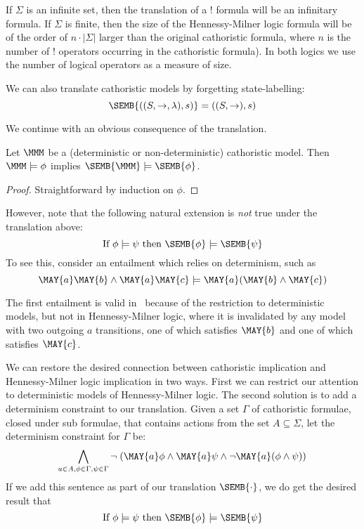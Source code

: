\NI If $\Sigma$ is an infinite set, then the translation of a $!$
formula will be an infinitary formula.  If $\Sigma$ is finite, then
the size of the Hennessy-Milner logic formula will be of the order of $n \cdot | \Sigma |$
larger than the original cathoristic formula, where $n$ is the number of
$!$ operators occurring in the cathoristic formula). In both logics we
use the number of logical operators as a measure of size.

We can also translate cathoristic models by forgetting state-labelling:
\[
   \SEMB{((S, \rightarrow, \lambda), s)} 
      =
   ((S, \rightarrow), s)
\]

\NI We continue with an obvious consequence of the translation.

\begin{theorem}
Let $\MMM$ be a (deterministic or non-deterministic) cathoristic
  model. Then $\MMM \models \phi$ implies $\SEMB{\MMM} \models
  \SEMB{\phi}$.
\end{theorem}
\begin{proof}
Straightforward by induction on $\phi$.
\end{proof}

\NI However, note that the following natural extension is \emph{not} true
under the translation above:
\[
  \text{If } \phi \models \psi \text{ then } \SEMB{\phi} \models \SEMB{\psi}
\]
To see this, consider an entailment which relies on determinism, such as
\[
\MAY{a} \MAY{b} \land \MAY{a} \MAY{c} \models \MAY{a} (\MAY{b} \land \MAY{c})
\]

\NI The first entailment is valid in \cathoristic\ because of the
restriction to deterministic models, but not in Hennessy-Milner
logic, where it is invalidated by any model with two outgoing $a$
transitions, one of which satisfies $\MAY{b}$ and one of which
satisfies $\MAY{c}$.

We can restore the desired connection between cathoristic implication and
Hennessy-Milner logic implication in two ways. First we can restrict
our attention to deterministic models of Hennessy-Milner logic.  The
second solution is to add a determinism constraint to our
translation. Given a set $\Gamma$ of cathoristic formulae, closed under
sub formulae, that contains actions from the set $A \subseteq \Sigma$,
let the determinism constraint for $\Gamma$ be:
\[
\bigwedge_{a \in A, \phi \in \Gamma, \psi \in \Gamma} \neg \; (\MAY{a} \phi \land \MAY{a} \psi \land \neg \MAY{a} (\phi \land \psi) )
\]
If we add this sentence as part of our translation $\SEMB{\cdot}$, we
do get the desired result that
\[
\text{If } \phi \models \psi \text{ then } \SEMB{\phi} \models \SEMB{\psi}
\]


